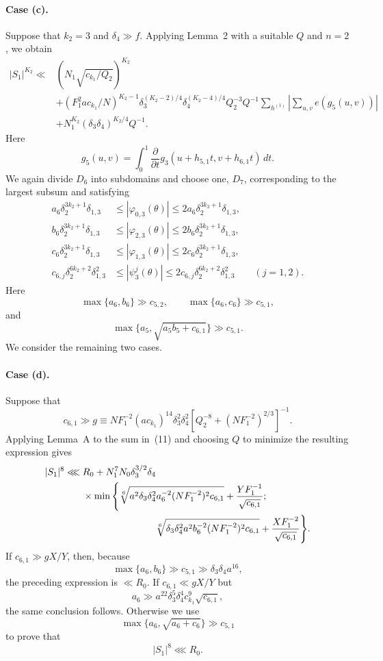 \documentclass[10pt]{article}
\begin{document}
\paragraph{Case (c).}
Suppose that $k_2=3$ and $\delta_4\gg f$. Applying Lemma~2 with a suitable $Q$ and $n=2$, we obtain
\begin{equation}
\begin{aligned}
  |S_1|^{K_2}\ll{}&
  \left(N_1\sqrt{c_{k_1}/Q_2}\right)^{K_2}\\
  &+(F_1^2ac_{k_1}/N)^{K_2-1}
  \delta_3^{(K_2-2)/4}\delta_4^{(K_2-4)/4}Q_2^{-3}Q^{-1}
  \sum_{h^{(1)}}\left|\sum_{u,v}e(g_5(u,v))\right|\\
  &+N_1^{K_2}(\delta_3\delta_4)^{K_2/4}Q^{-1}.
\end{aligned}
\tag{11}
\end{equation}
Here
\[
  g_5(u,v)=\int_0^1\frac{\partial}{\partial t}
  g_3(u+h_{5,1}t,v+h_{6,1}t)\,dt.
\]
We again divide $D_6$ into subdomains and choose one, $D_7$, corresponding to the largest subsum and satisfying
\[
\begin{aligned}
  a_6\delta_2^{3k_2+1}\delta_{1,3}
  &\leqslant|\varphi_{0,3}(\theta)|
   \leqslant2a_6\delta_2^{3k_2+1}\delta_{1,3},\\
  b_6\delta_2^{3k_2+1}\delta_{1,3}
  &\leqslant|\varphi_{2,3}(\theta)|
   \leqslant2b_6\delta_2^{3k_2+1}\delta_{1,3},\\
  c_6\delta_2^{3k_2+1}\delta_{1,3}
  &\leqslant|\varphi_{1,3}(\theta)|
   \leqslant2c_6\delta_2^{3k_2+1}\delta_{1,3},\\
  c_{6,j}\delta_2^{6k_2+2}\delta_{1,3}^2
  &\leqslant|\psi_3^j(\theta)|
   \leqslant2c_{6,j}\delta_2^{6k_2+2}\delta_{1,3}^2
  \qquad(j=1,2).
\end{aligned}
\]
Here
\[
  \max\{a_6,b_6\}\gg c_{5,2},
  \qquad \max\{a_6,c_6\}\gg c_{5,1},
\]
and
\[
  \max\{a_5,\sqrt{a_5b_5+c_{6,1}}\}\gg c_{5,1}.
\]
We consider the remaining two cases.

\paragraph{Case (d).}
Suppose that
\[
  c_{6,1}\gg g\equiv
  NF_1^{-2}(ac_{k_1})^{14}\delta_3^2\delta_4^2
  \left[Q_2^{-8}+(NF_1^{-2})^{2/3}\right]^{-1}.
\]
Applying Lemma~A to the sum in~(11) and choosing $Q$ to minimize the resulting expression gives
\[
\begin{aligned}
  |S_1|^8\lll{}&R_0+N_1^7N_0\delta_3^{3/2}\delta_4\\
  &\times\min\Bigg\{
    \sqrt[6]{a^2\delta_3\delta_4^2a_6^{-2}(NF_1^{-2})^2c_{6,1}}
      +\frac{YF_1^{-1}}{\sqrt{c_{6,1}}};\\
  &\hspace{27mm}
    \sqrt[6]{\delta_3\delta_4^2a^2b_6^{-2}(NF_1^{-2})^2c_{6,1}}
      +\frac{XF_1^{-2}}{\sqrt{c_{6,1}}}
  \Bigg\}.
\end{aligned}
\]
If $c_{6,1}\gg gX/Y$, then, because
\[
  \max\{a_6,b_6\}\gg c_{5,1}\gg\delta_3\delta_4a^{16},
\]
the preceding expression is $\ll R_0$. If $c_{6,1}\ll gX/Y$ but
\[
  a_6\gg a^{22}\delta_3^5\delta_4^4c_{k_1}^9\sqrt{c_{6,1}},
\]
the same conclusion follows. Otherwise we use
\[
  \max\{a_6,\sqrt{a_6+c_6}\}\gg c_{5,1}
\]
to prove that
\[
  |S_1|^8\lll R_0.
\]
\end{document}
